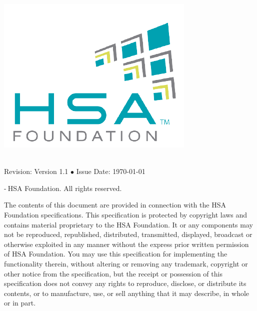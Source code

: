 \documentclass[final,oneside]{book}
\newcommand{\doctitle}{HSA Runtime Programmer's Reference Manual}
\begin{document}
\providecommand{\DIFadd}[1]{{\protect\color{Green}#1}}
\renewcommand{\DIFadd}[1]{{\protect\color{Green}#1}}

\providecommand{\DIFdel}[1]{{\protect\color{red}\sout{\mbox{#1}}}}
\renewcommand{\DIFdel}[1]{{\protect\color{red}\sout{\mbox{#1}}}}


\begin{titlepage}
\includegraphics[width=.3\textwidth]{fig/foundation.png}
\vspace*{7cm}
\begin{center}
{\Huge \color{Cerulean}{\doctitle}\\[7cm]}
{\small Revision: Version 1.1 $\bullet$ Issue Date: \today}\\ %
\end{center}
\end{titlepage}
\thispagestyle{empty} {-\the\year $\:$HSA Foundation. All rights
  reserved.}


The contents of this document are provided in connection with the HSA Foundation
specifications. This specification is protected by copyright laws and contains
material proprietary to the HSA Foundation. It or any components may not be
reproduced, republished, distributed, transmitted, displayed, broadcast or
otherwise exploited in any manner without the express prior written permission
of HSA Foundation. You may use this specification for implementing the
functionality therein, without altering or removing any trademark, copyright or
other notice from the specification, but the receipt or possession of this
specification does not convey any rights to reproduce, disclose, or distribute
its contents, or to manufacture, use, or sell anything that it may describe, in
whole or in part.
\end{document}
